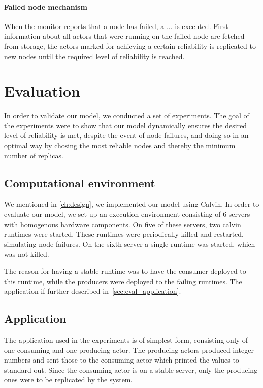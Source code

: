 \documentclass{cslthse-msc}
\begin{document}
\subsubsection{Failed node mechanism}
When the monitor reports that a node has failed, a ... is executed. First information about all actors that were running on the failed node are fetched from storage, the actors marked for achieving a certain reliability is replicated to new nodes until the required level of reliability is reached. 



\chapter{Evaluation} \label{ch:evaluation}
In order to validate our model, we conducted a set of experiments. The goal of the experiments were to show that our model dynamically ensures the desired level of reliability is met, despite the event of node failures, and doing so in an optimal way by chosing the most reliable nodes and thereby the minimum number of replicas.

\section{Computational environment} \label{sec:eval_comp_env}
We mentioned in \autoref{ch:design}, we implemented our model using Calvin. In order to evaluate our model, we set up an execution environment consisting of 6 servers with homogenous hardware components. On five of these servers, two calvin runtimes were started. These runtimes were periodically killed and restarted, simulating node failures. On the sixth server a single runtime was started, which was not killed.

The reason for having a stable runtime was to have the consumer deployed to this runtime, while the producers were deployed to the failing runtimes. The application if further described in~\autoref{sec:eval_application}.

\section{Application} \label{sec:eval_application}
The application used in the experiments is of simplest form, consisting only of one consuming and one producing actor. The producing actors produced integer numbers and sent those to the consuming actor which printed the values to standard out. Since the consuming actor is on a stable server, only the producing ones were to be replicated by the system.
\end{document}
